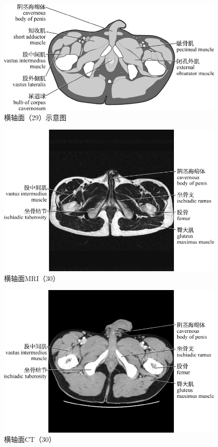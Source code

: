 \begin{figure}[!htbp]
 \centering
 \includegraphics{./images/Image00088.jpg}
 \captionsetup{justification=centering}
 \caption{横轴面（29）示意图}
  \end{figure} 
 \FloatBarrier

\begin{figure}[!htbp]
 \centering
 \includegraphics{./images/Image00089.jpg}
 \captionsetup{justification=centering}
 \caption{横轴面MRI（30）}
  \end{figure} 
 \FloatBarrier

\begin{figure}[!htbp]
 \centering
 \includegraphics{./images/Image00090.jpg}
 \captionsetup{justification=centering}
 \caption{横轴面CT（30）}
  \end{figure} 
 \FloatBarrier

